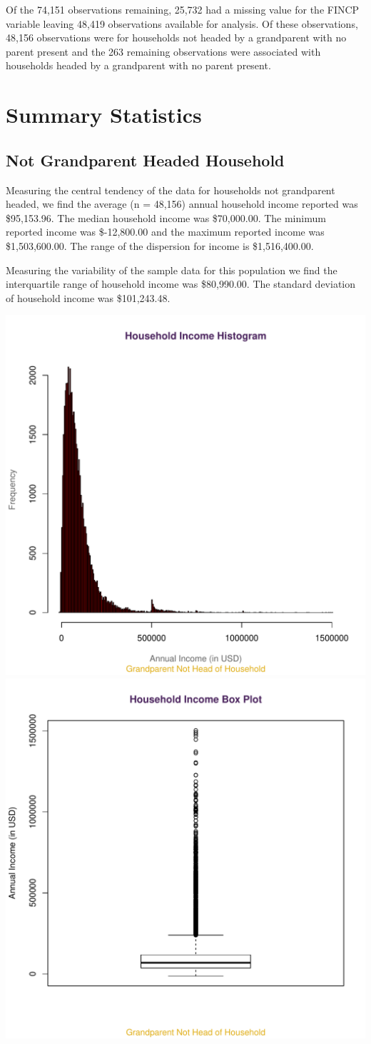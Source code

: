 \documentclass[oneside]{article}
\begin{document}
Of the 74,151 observations remaining, 25,732 had a missing value for the FINCP variable leaving 48,419 observations available for analysis. Of these observations, 48,156 observations were for households not headed by a grandparent with no parent present and the 263 remaining observations were associated with households headed by a grandparent with no parent present.

\newpage
\section{Summary Statistics}
\subsection{Not Grandparent Headed Household}

Measuring the central tendency of the data for households not grandparent headed, we find the average (n = 48,156) annual household income reported was \$95,153.96. The median household income was \$70,000.00. The minimum reported income was \$-12,800.00 and the maximum reported income was \$1,503,600.00. The range of the dispersion for income is \$1,516,400.00.

Measuring the variability of the sample data for this population we find the interquartile range of household income was \$80,990.00. The standard deviation of household income was \$101,243.48.

\includegraphics[width = .5\linewidth]{hist_nghh}
\includegraphics[width = .5\linewidth]{box_nghh}
\end{document}
